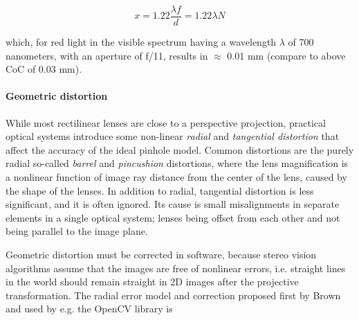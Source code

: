 \begin{equation} \label{eq:airydisk}
	x = 1.22 \frac{\lambda f}{d} = 1.22 \lambda N
\end{equation}


which, for red light in the visible spectrum having a wavelength $\lambda$ of 700 nanometers, with an aperture of f/11, results in $\approx$ 0.01 mm (compare to above CoC of 0.03 mm).



\paragraph{Geometric distortion}
While most rectilinear lenses are close to a perspective projection, practical optical systems introduce some non-linear \emph{radial} and \emph{tangential distortion} that affect the accuracy of the ideal pinhole model.
Common distortions are the purely radial so-called \emph{barrel} and \emph{pincushion} distortions, where the lens magnification is a nonlinear function of image ray distance from the center of the lens, caused by the shape of the lenses. \cite{brown1966decentering}
In addition to radial, tangential distortion is less significant, and it is often ignored.
Its cause is small misalignments in separate elements in a single optical system; lenses being offset from each other and not being parallel to the image plane. \cite{kingslake1989history}



Geometric distortion must be corrected in software, because stereo vision algorithms assume that the images are free of nonlinear errors, i.e. straight lines in the world should remain straight in 2D images after the projective transformation.
\cite{szeliski10vision}
The radial error model and correction proposed first by Brown \cite{brown1966decentering} and used by e.g. the OpenCV library \cite{opencv} is %

